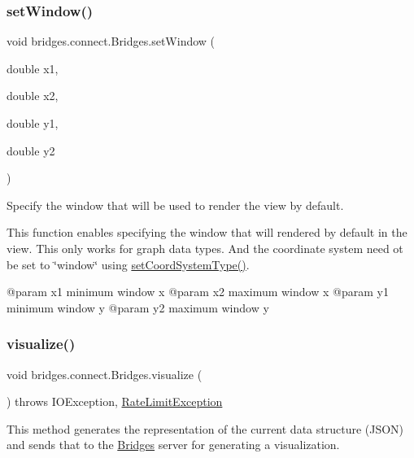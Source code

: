 \subsubsection{\texorpdfstring{set\+Window()}{setWindow()}\hspace{0.1cm}{\footnotesize\ttfamily [3/3]}}
{\footnotesize\ttfamily void bridges.\+connect.\+Bridges.\+set\+Window (\begin{DoxyParamCaption}\item[{double}]{x1,  }\item[{double}]{x2,  }\item[{double}]{y1,  }\item[{double}]{y2 }\end{DoxyParamCaption})}



Specify the window that will be used to render the view by default. 

This function enables specifying the window that will rendered by default in the view. This only works for graph data types. And the coordinate system need ot be set to \char`\"{}window\char`\"{} using \hyperlink{classbridges_1_1connect_1_1_bridges_ade4a9c43e2b608e6b3dc774b73f95749}{set\+Coord\+System\+Type()}. \begin{DoxyVerb}@param x1   minimum window x
@param x2   maximum window x
@param y1   minimum window y
@param y2   maximum window y\end{DoxyVerb}
 \mbox{\label{classbridges_1_1connect_1_1_bridges_a1853d64ffb8675ba2ec227a2b819cd24}} 
\subsubsection{\texorpdfstring{visualize()}{visualize()}}
{\footnotesize\ttfamily void bridges.\+connect.\+Bridges.\+visualize (\begin{DoxyParamCaption}{ }\end{DoxyParamCaption}) throws I\+O\+Exception, \hyperlink{classbridges_1_1validation_1_1_rate_limit_exception}{Rate\+Limit\+Exception}}

This method generates the representation of the current data structure (J\+S\+ON) and sends that to the \hyperlink{classbridges_1_1connect_1_1_bridges}{Bridges} server for generating a visualization.


